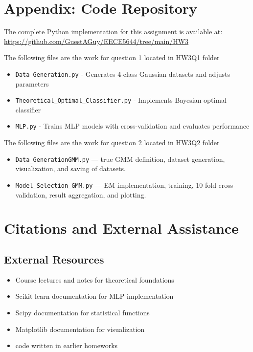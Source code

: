 \documentclass[12pt]{article}
\begin{document}
\newpage
\section*{Appendix: Code Repository}
\label{sec:appendix}

The complete Python implementation for this assignment is available at: \\
\url{https://github.com/GuestAGuy/EECE5644/tree/main/HW3}

The following files are the work for question 1 located in HW3Q1 folder
\begin{itemize}
    \item \texttt{Data\_Generation.py} - Generates 4-class Gaussian datasets and adjusts parameters
    \item \texttt{Theoretical\_Optimal\_Classifier.py} - Implements Bayesian optimal classifier
    \item \texttt{MLP.py} - Trains MLP models with cross-validation and evaluates performance
\end{itemize}

The following files are the work for question 2 located in HW3Q2 folder
\begin{itemize}
    \item \texttt{Data\_GenerationGMM.py} — true GMM definition, dataset generation, visualization, and saving of datasets.
    \item \texttt{Model\_Selection\_GMM.py} — EM implementation, training, 10-fold cross-validation, result aggregation, and plotting. 
\end{itemize}
\newpage
\section*{Citations and External Assistance}

\subsection*{External Resources}
\begin{itemize}
    \item Course lectures and notes for theoretical foundations
    \item Scikit-learn documentation for MLP implementation
    \item Scipy documentation for statistical functions
    \item Matplotlib documentation for visualization
    \item code written in earlier homeworks
\end{itemize}
\end{document}

